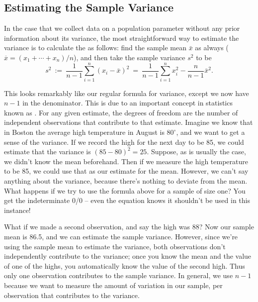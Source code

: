 \subsection{Estimating the Sample Variance}

In the case that we collect data on a population parameter without any prior information about its variance, the most straightforward way to estimate the variance is to calculate the  as follows: find the sample mean $\bar{x}$ as always ($\overline{x} = (x_1+\cdots+x_n)/n$), and then take the sample variance $s^2$ to be
\begin{equation*}
s^{2}\ := \ \frac{1}{n-1}\sum_{i=1}^{n}\left(x_{i}-\bar{x}\right)^{2}\ = \ \frac{1}{n-1}\sum_{i=1}^{n}x_{i}^{2}-\frac{n}{n-1}\bar{x}^{2}.
\end{equation*}

This looks remarkably like our regular formula for variance, except we now have $n-1$ in the denominator. This is due to an important concept in statistics known as . For any given estimate, the degrees of freedom are the number of independent observations that contribute to that estimate. Imagine we know that in Boston the average high temperature in August is $80^{\circ}$, and we want to get a sense of the variance. If we record the high for the next day to be 85, we could estimate that the variance is $\left(85-80\right)^{2}=25$. Suppose, as is usually the case, we didn't know the mean beforehand. Then if we measure the high temperature to be 85, we could use that as our estimate for the mean. However, we can't say anything about the variance, because there's nothing to deviate from the mean. What happens if we try to use the formula above for a sample of size one? You get the indeterminate 0/0 -- even the equation knows it shouldn't be used in this instance!

What if we made a second observation, and say the high was 88? Now our sample mean is 86.5, and we can estimate the sample variance. However, since we're using the sample mean to estimate the variance, both observations don't independently contribute to the variance; once you know the mean and the value of one of the highs, you automatically know the value of the second high. Thus only one observation contributes to the sample variance. In general, we use $n-1$ because we want to measure the amount of variation in our sample, per observation that contributes to the variance.

\ \\

